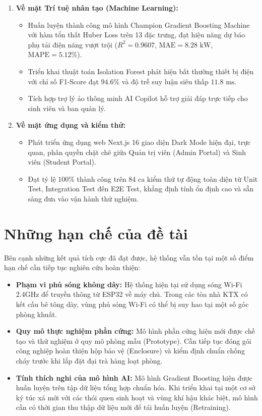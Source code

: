 \begin{enumerate}
    \item \textbf{Về mặt Trí tuệ nhân tạo (Machine Learning):}
    \begin{itemize}
        \item Huấn luyện thành công mô hình Champion Gradient Boosting Machine với hàm tổn thất Huber Loss trên 13 đặc trưng, đạt hiệu năng dự báo phụ tải điện năng vượt trội ($R^2 = 0.9607$, $\text{MAE} = 8.28\text{ kW}$, $\text{MAPE} = 5.12\%$).
        \item Triển khai thuật toán Isolation Forest phát hiện bất thường thiết bị điện với chỉ số F1-Score đạt $94.6\%$ và độ trễ suy luận siêu thấp $11.8\text{ ms}$.
        \item Tích hợp trợ lý ảo thông minh AI Copilot hỗ trợ giải đáp trực tiếp cho sinh viên và ban quản lý.
    \end{itemize}

    \item \textbf{Về mặt ứng dụng và kiểm thử:}
    \begin{itemize}
        \item Phát triển ứng dụng web Next.js 16 giao diện Dark Mode hiện đại, trực quan, phân quyền chặt chẽ giữa Quản trị viên (Admin Portal) và Sinh viên (Student Portal).
        \item Đạt tỷ lệ $100\%$ thành công trên 84 ca kiểm thử tự động toàn diện từ Unit Test, Integration Test đến E2E Test, khẳng định tính ổn định cao và sẵn sàng đưa vào vận hành thử nghiệm.
    \end{itemize}
\end{enumerate}

\section{Những hạn chế của đề tài}
\label{sec:han_che}

Bên cạnh những kết quả tích cực đã đạt được, hệ thống vẫn tồn tại một số điểm hạn chế cần tiếp tục nghiên cứu hoàn thiện:
\begin{itemize}
    \item \textbf{Phạm vi phủ sóng không dây:} Hệ thống hiện tại sử dụng sóng Wi-Fi 2.4GHz để truyền thông từ ESP32 về máy chủ. Trong các tòa nhà KTX có kết cấu bê tông dày, vùng phủ sóng Wi-Fi có thể bị suy hao tại một số góc phòng khuất.
    \item \textbf{Quy mô thực nghiệm phần cứng:} Mô hình phần cứng hiện mới được chế tạo và thử nghiệm ở quy mô phòng mẫu (Prototype). Cần tiếp tục đóng gói công nghiệp hoàn thiện hộp bảo vệ (Enclosure) và kiểm định chuẩn chống cháy trước khi lắp đặt đại trà hàng loạt phòng.
    \item \textbf{Tính thích nghi của mô hình AI:} Mô hình Gradient Boosting hiện được huấn luyện trên tập dữ liệu tổng hợp chuẩn hóa. Khi triển khai tại một cơ sở ký túc xá mới với các thói quen sinh hoạt và vùng khí hậu khác biệt, mô hình cần có thời gian thu thập dữ liệu mới để tái huấn luyện (Retraining).
\end{itemize}

